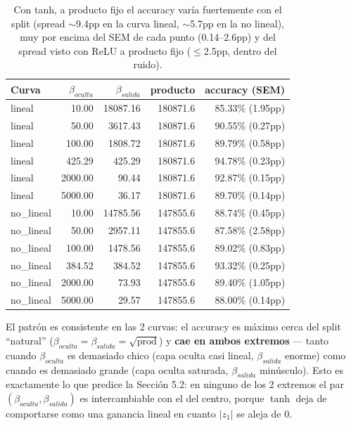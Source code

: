 \documentclass[11pt]{article}
\begin{document}
\begin{table}[htbp]\centering\begin{tabular}{@{}lrrrr@{}}\toprule

Curva & $\beta_{oculta}$ & $\beta_{salida}$ & producto & accuracy (SEM) \\ \midrule

lineal & 10.00 & 18087.16 & 180871.6 & 85.33\% (1.95pp) \\

lineal & 50.00 & 3617.43 & 180871.6 & 90.55\% (0.27pp) \\

lineal & 100.00 & 1808.72 & 180871.6 & 89.79\% (0.58pp) \\

lineal & 425.29 & 425.29 & 180871.6 & 94.78\% (0.23pp) \\

lineal & 2000.00 & 90.44 & 180871.6 & 92.87\% (0.15pp) \\

lineal & 5000.00 & 36.17 & 180871.6 & 89.70\% (0.14pp) \\

no\_lineal & 10.00 & 14785.56 & 147855.6 & 88.74\% (0.45pp) \\

no\_lineal & 50.00 & 2957.11 & 147855.6 & 87.58\% (2.58pp) \\

no\_lineal & 100.00 & 1478.56 & 147855.6 & 89.02\% (0.83pp) \\

no\_lineal & 384.52 & 384.52 & 147855.6 & 93.32\% (0.25pp) \\

no\_lineal & 2000.00 & 73.93 & 147855.6 & 89.40\% (1.05pp) \\

no\_lineal & 5000.00 & 29.57 & 147855.6 & 88.00\% (0.14pp) \\

\bottomrule\end{tabular}

\caption{Con tanh, a producto fijo el accuracy varía fuertemente con el split (spread $\sim$9.4pp en la curva lineal, $\sim$5.7pp en la no lineal), muy por encima del SEM de cada punto (0.14--2.6pp) y del spread visto con ReLU a producto fijo ($\le$2.5pp, dentro del ruido).}

\end{table}

El patrón es consistente en las 2 curvas: el accuracy es máximo cerca del split ``natural'' ($\beta_{oculta}=\beta_{salida}=\sqrt{\text{prod}}$) y \textbf{cae en ambos extremos} — tanto cuando $\beta_{oculta}$ es demasiado chico (capa oculta casi lineal, $\beta_{salida}$ enorme) como cuando es demasiado grande (capa oculta saturada, $\beta_{salida}$ minúsculo). Esto es exactamente lo que predice la Sección 5.2: en ninguno de los 2 extremos el par $(\beta_{oculta},\beta_{salida})$ es intercambiable con el del centro, porque $\tanh$ deja de comportarse como una ganancia lineal en cuanto $|z_1|$ se aleja de 0.
\end{document}
